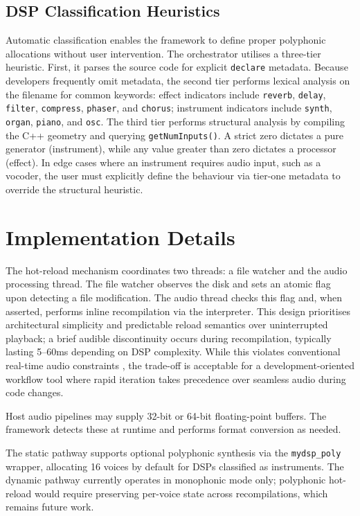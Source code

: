 \documentclass[twoside,a4paper]{article}
\begin{document}
\subsection{DSP Classification Heuristics}

Automatic classification enables the framework to define proper polyphonic allocations without user intervention. The orchestrator utilises a three-tier heuristic. First, it parses the source code for explicit \texttt{declare} metadata. Because developers frequently omit metadata, the second tier performs lexical analysis on the filename for common keywords: effect indicators include \texttt{reverb}, \texttt{delay}, \texttt{filter}, \texttt{compress}, \texttt{phaser}, and \texttt{chorus}; instrument indicators include \texttt{synth}, \texttt{organ}, \texttt{piano}, and \texttt{osc}. The third tier performs structural analysis by compiling the C++ geometry and querying \texttt{getNumInputs()}. A strict zero dictates a pure generator (instrument), while any value greater than zero dictates a processor (effect). In edge cases where an instrument requires audio input, such as a vocoder, the user must explicitly define the behaviour via tier-one metadata to override the structural heuristic.

\section{Implementation Details}
\label{sec:implementation}

The hot-reload mechanism coordinates two threads: a file watcher and the audio processing thread. The file watcher observes the disk and sets an atomic flag upon detecting a file modification. The audio thread checks this flag and, when asserted, performs inline recompilation via the interpreter. This design prioritises architectural simplicity and predictable reload semantics over uninterrupted playback; a brief audible discontinuity occurs during recompilation, typically lasting 5--60ms depending on DSP complexity. While this violates conventional real-time audio constraints \cite{Bencina2011}, the trade-off is acceptable for a development-oriented workflow tool where rapid iteration takes precedence over seamless audio during code changes.

Host audio pipelines may supply 32-bit or 64-bit floating-point buffers. The framework detects these at runtime and performs format conversion as needed.

The static pathway supports optional polyphonic synthesis via the \texttt{mydsp\_poly} wrapper, allocating 16 voices by default for DSPs classified as instruments. The dynamic pathway currently operates in monophonic mode only; polyphonic hot-reload would require preserving per-voice state across recompilations, which remains future work.
\end{document}
